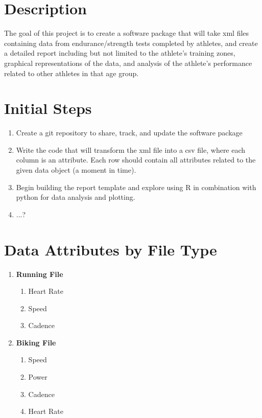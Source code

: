 \documentclass{article}
\begin{document}
\maketitle

\section*{Description} The goal of this project is to create a software package that will take xml files containing data from endurance/strength tests completed by athletes, and create a detailed report including but not limited to the athlete's training zones, graphical representations of the data, and analysis of the athlete's performance related to other athletes in that age group.

\section*{Initial Steps}
\begin{enumerate}
	\item Create a git repository to share, track, and update the software package
	\item Write the code that will transform the xml file into a csv file, where each column is an attribute. Each row should contain all attributes related to the given data object (a moment in time). 
	\item Begin building the report template and explore using R in combination with python for data analysis and plotting.
	\item ...?
\end{enumerate}
\section*{Data Attributes by File Type} 
\begin{enumerate}
	\item[]\textbf{Running File}
	\begin{enumerate}
		\item Heart Rate
		\item Speed
		\item Cadence
	\end{enumerate}
	\item[]\textbf{Biking File}
	\begin{enumerate}
		\item Speed
		\item Power
		\item Cadence
		\item Heart Rate
	\end{enumerate}
\end{enumerate}
\end{document}
